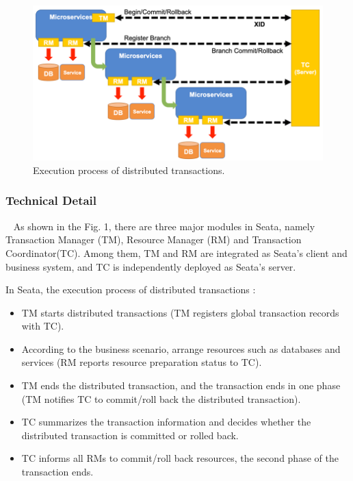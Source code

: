 \documentclass[conference]{IEEEtran}
\begin{document}
\begin{figure}[h]
\centering
\includegraphics[width=1\columnwidth]{seata}
\caption{Execution process of distributed transactions.}
\label{fig}
\end{figure}

\subsubsection{Technical Detail}
\ 
\newline
\indent 
As shown in the Fig. 1, there are three major modules in Seata, namely Transaction Manager (TM), Resource Manager (RM) and Transaction Coordinator(TC). Among them, TM and RM are integrated as Seata's client and business system, and TC is independently deployed as Seata's server.



In Seata, the execution process of distributed transactions \cite{b12}:

\begin{itemize}
\item TM starts distributed transactions (TM registers global transaction records with TC).
\item According to the business scenario, arrange resources such as databases and services (RM reports resource preparation status to TC).
\item TM ends the distributed transaction, and the transaction ends in one phase (TM notifies TC to commit/roll back the distributed transaction).
\item TC summarizes the transaction information and decides whether the distributed transaction is committed or rolled back.
\item TC informs all RMs to commit/roll back resources, the second phase of the transaction ends.
\end{itemize}
\end{document}
